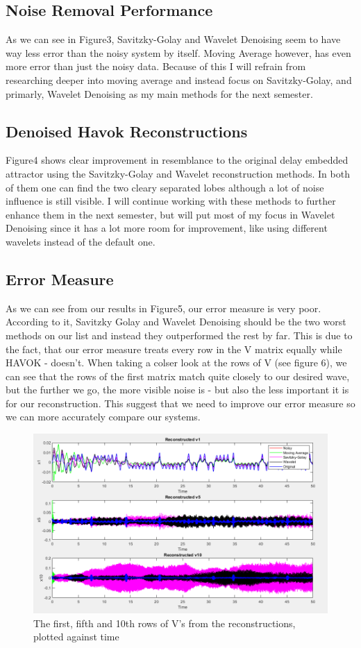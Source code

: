 \documentclass[11pt]{article}
\begin{document}
	\subsection{Noise Removal Performance}
	As we can see in Figure3, Savitzky-Golay and Wavelet Denoising seem to have way less error than the noisy system by itself. Moving Average however, has even more error than just the noisy data. Because of this I will refrain from researching deeper into moving average and instead focus on Savitzky-Golay, and primarly, Wavelet Denoising as my main methods for the next semester. 
	
	\subsection{Denoised Havok Reconstructions}
	Figure4 shows clear improvement in resemblance to the original delay embedded attractor using the Savitzky-Golay and Wavelet reconstruction methods. In both of them one can find the two cleary separated lobes although a lot of noise influence is still visible. I will continue working with these methods to further enhance them in the next semester, but will put most of my focus in Wavelet Denoising since it has a lot more room for improvement, like using different wavelets instead of the default one.
	
	\subsection{Error Measure}
	As we can see from our results in Figure5, our error measure is very poor. According to it, Savitzky Golay and Wavelet Denoising should be the two worst methods on our list and instead they outperformed the rest by far. This is due to the fact, that our error measure treats every row in the V matrix equally while HAVOK - doesn't. When taking a colser look at the rows of V (see figure 6), we can see that the rows of the first matrix match quite closely to our desired wave, but the further we go, the more visible noise is - but also the less important it is for our reconstruction. This suggest that we need to improve our error measure so we can more accurately compare our systems.
	
	\begin{figure}
		\centering
		\includegraphics[width=0.7\linewidth]{Figure6}
		\caption{The first, fifth and 10th rows of V's from the reconstructions, plotted against time}
		\label{fig:figure6}
	\end{figure}
	
\end{document}
